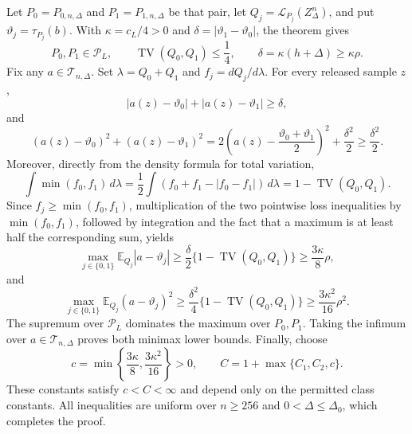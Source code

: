 Let \(P_0=P_{0,n,\Delta}\) and \(P_1=P_{1,n,\Delta}\) be that pair, let \(Q_j=\mathcal L_{P_j}(Z_\Delta^n)\), and put \(\vartheta_j=\tau_{P_j}(b)\).  With \(\kappa=c_L/4>0\) and \(\delta=|\vartheta_1-\vartheta_0|\), the theorem gives
\[
 P_0,P_1\in\mathcal P_L,
 \qquad
 \operatorname{TV}(Q_0,Q_1)\leq\frac14,
 \qquad
 \delta=\kappa(h+\Delta)\geq\kappa\rho.
\]
Fix any \(a\in\mathcal T_{n,\Delta}\).  Set \(\lambda=Q_0+Q_1\) and \(f_j=dQ_j/d\lambda\).  For every released sample \(z\),
\[
 |a(z)-\vartheta_0|+|a(z)-\vartheta_1|\geq\delta,
\]
and
\[
 (a(z)-\vartheta_0)^2+(a(z)-\vartheta_1)^2
 =2\left(a(z)-\frac{\vartheta_0+\vartheta_1}{2}\right)^2+\frac{\delta^2}{2}
 \geq\frac{\delta^2}{2}.
\]
Moreover, directly from the density formula for total variation,
\[
 \int\min(f_0,f_1)\,d\lambda
 =\frac12\int(f_0+f_1-|f_0-f_1|)\,d\lambda
 =1-\operatorname{TV}(Q_0,Q_1).
\]
Since \(f_j\geq\min(f_0,f_1)\), multiplication of the two pointwise loss inequalities by \(\min(f_0,f_1)\), followed by integration and the fact that a maximum is at least half the corresponding sum, yields
\[
 \max_{j\in\{0,1\}}\mathbb E_{Q_j}|a-\vartheta_j|
 \geq\frac\delta2\{1-\operatorname{TV}(Q_0,Q_1)\}
 \geq\frac{3\kappa}{8}\rho,
\]
and
\[
 \max_{j\in\{0,1\}}\mathbb E_{Q_j}(a-\vartheta_j)^2
 \geq\frac{\delta^2}{4}\{1-\operatorname{TV}(Q_0,Q_1)\}
 \geq\frac{3\kappa^2}{16}\rho^2.
\]
The supremum over \(\mathcal P_L\) dominates the maximum over \(P_0,P_1\).  Taking the infimum over \(a\in\mathcal T_{n,\Delta}\) proves both minimax lower bounds.  Finally, choose
\[
 c=\min\left\{\frac{3\kappa}{8},\frac{3\kappa^2}{16}\right\}>0,
 \qquad
 C=1+\max\{C_1,C_2,c\}.
\]
These constants satisfy \(c<C<\infty\) and depend only on the permitted class constants.  All inequalities are uniform over \(n\geq256\) and \(0<\Delta\leq\Delta_0\), which completes the proof.